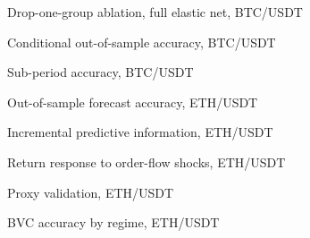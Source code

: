 \begin{table}[H]
\centering\caption{Drop-one-group ablation, full elastic net, BTC/USDT}\label{tab:dropgroup}

\end{table}

\begin{table}[H]
\centering\caption{Conditional out-of-sample accuracy, BTC/USDT}\label{tab:conditional}
\resizebox{\textwidth}{!}{}
\end{table}

\begin{table}[H]
\centering\caption{Sub-period accuracy, BTC/USDT}\label{tab:subperiods}
\resizebox{\textwidth}{!}{}
\end{table}

\begin{table}[H]
\centering\caption{Out-of-sample forecast accuracy, ETH/USDT}\label{tab:forecast_eth}
\resizebox{\textwidth}{!}{}
\end{table}

\begin{table}[H]
\centering\caption{Incremental predictive information, ETH/USDT}\label{tab:incremental_eth}
\resizebox{\textwidth}{!}{}
\end{table}

\begin{table}[H]
\centering\caption{Return response to order-flow shocks, ETH/USDT}\label{tab:response_eth}

\end{table}

\begin{table}[H]
\centering\caption{Proxy validation, ETH/USDT}\label{tab:validation_eth}
\resizebox{\textwidth}{!}{}
\end{table}

\begin{table}[H]
\centering\caption{BVC accuracy by regime, ETH/USDT}\label{tab:regimes_eth}

\end{table}
